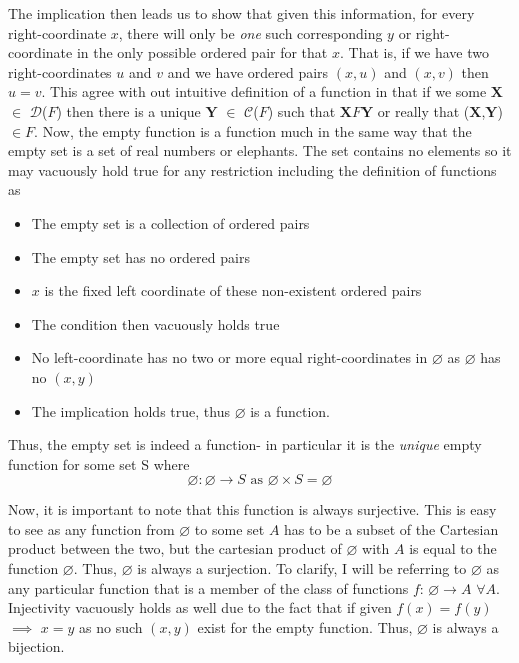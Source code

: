 \documentclass{article}
\begin{document}
\par The implication then leads us to show that given this information, for every right-coordinate $x$, there will only be \textit{one} such corresponding $y$ or right-coordinate in the only possible ordered pair for that $x$. That is, if we have two right-coordinates $u$ and $v$ and we have ordered pairs $(x,u)$ and $(x,v)$ then $u=v$. This agree with out intuitive definition of a function in that if we some $\mathbf{X}$ $\in$ $\mathcal{D}$($F$) then there is a unique $\mathbf{Y}$ $\in$ $\mathcal{C}$($F$) such that $\mathbf{X}$$F$$\mathbf{Y}$ or really that ($\mathbf{X}$,$\mathbf{Y}$) $\in F$. Now, the empty function is a function much in the same way that the empty set is a set of real numbers or elephants. The set contains no elements so it may vacuously hold true for any restriction including the definition of functions as 
\begin{itemize}
\item The empty set is a collection of ordered pairs
\item The empty set has no ordered pairs
\item $x$ is the fixed left coordinate of these non-existent ordered pairs
\item The condition then vacuously holds true
\item No left-coordinate has no two or more equal right-coordinates in $\varnothing$ as $\varnothing$ has no $(x,y)$
\item The implication holds true, thus $\varnothing$ is a function.
\end{itemize}
\par Thus, the empty set is indeed a function- in particular it is the \textit{unique} empty function for some set S where
\[
\varnothing: \varnothing \to S \text{ as } \varnothing \times S = \varnothing
\]
\par Now, it is important to note that this function is always surjective. This is easy to see as any function from $\varnothing$ to some set $A$ has to be a subset of the Cartesian product between the two, but the cartesian product of $\varnothing$ with $A$ is equal to the function $\varnothing$. Thus, $\varnothing$ is always a surjection. To clarify, I will be referring to $\varnothing$ as any particular function that is a member of the class of functions $f$: $\varnothing \to A$ \text{} $\forall A$. Injectivity vacuously holds as well due to the fact that if given $f(x)=f(y)$ $\implies$ $x=y$ as no such $(x,y)$ exist for the empty function. Thus, $\varnothing$ is always a bijection. 
\end{document}
